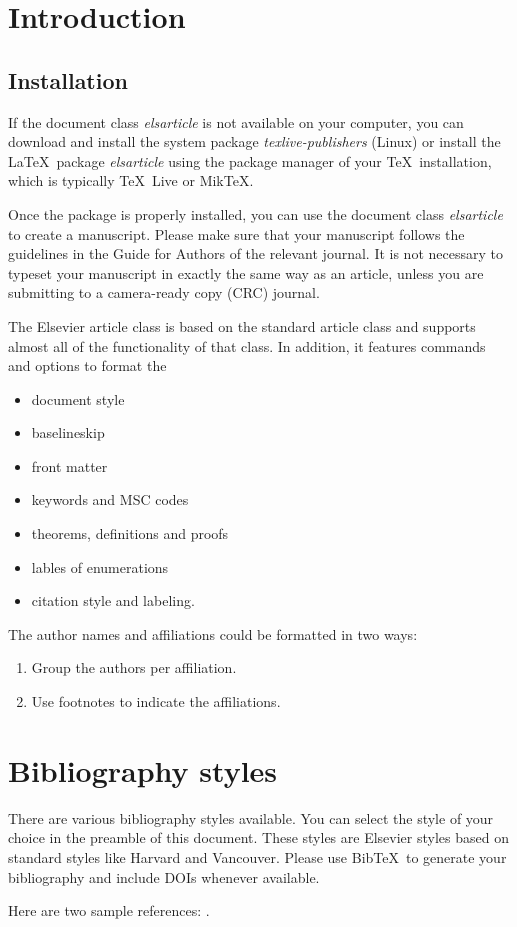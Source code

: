 \section{Introduction}
\label{sec:intro}

  \subsection{Installation} 
    If the document class \emph{elsarticle} is not available on your computer, you can download and install the system package \emph{texlive-publishers} (Linux) or install the \LaTeX\ package \emph{elsarticle} using the package manager of your \TeX\ installation, which is typically \TeX\ Live or Mik\TeX.

    Once the package is properly installed, you can use the document class \emph{elsarticle} to create a manuscript. Please make sure that your manuscript follows the guidelines in the Guide for Authors of the relevant journal. It is not necessary to typeset your manuscript in exactly the same way as an article, unless you are submitting to a camera-ready copy (CRC) journal.

    The Elsevier article class is based on the standard article class and supports almost all of the functionality of that class. In addition, it features commands and options to format the
    \begin{itemize}
      \item document style
      \item baselineskip
      \item front matter
      \item keywords and MSC codes
      \item theorems, definitions and proofs
      \item lables of enumerations
      \item citation style and labeling.
    \end{itemize}

    The author names and affiliations could be formatted in two ways:
    
    \begin{enumerate}[(1)]
      \item Group the authors per affiliation.
      \item Use footnotes to indicate the affiliations.
    \end{enumerate}
    
\section{Bibliography styles}

  There are various bibliography styles available. You can select the style of your choice in the preamble of this document. These styles are Elsevier styles based on standard styles like Harvard and Vancouver. Please use Bib\TeX\ to generate your bibliography and include DOIs whenever available.
  
  Here are two sample references: \cite{Feynman1963118,Dirac1953888}.
